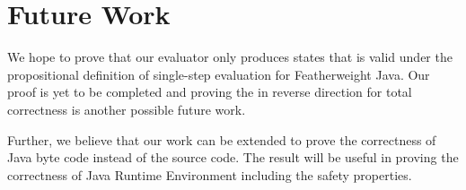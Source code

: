 \documentclass{article}
\begin{document}
\section{Future Work}

We hope to prove that our evaluator only produces states that is valid under the propositional definition of single-step evaluation for Featherweight Java. Our proof is yet to be completed and proving the in reverse direction for total correctness is another possible future work.

Further, we believe that our work can be extended to prove the correctness of Java byte code instead of the source code. The result will be useful in proving the correctness of Java Runtime Environment including the safety properties.

{}

\end{document}
